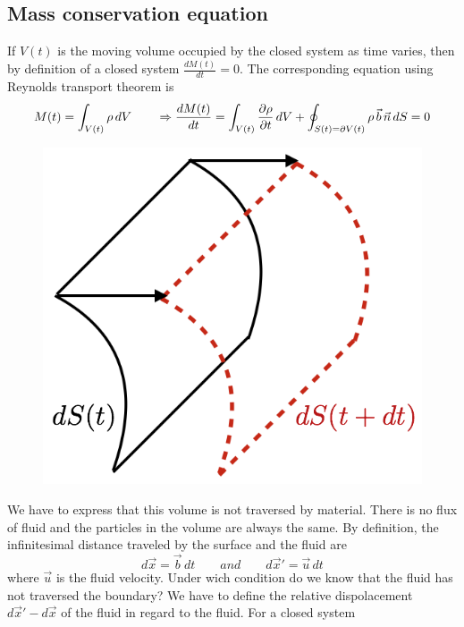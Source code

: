 	\subsection{Mass conservation equation}
	If $V(t)$ is the moving volume occupied by the closed system as time varies, then by definition of a closed system $\frac{dM(t)}{dt} = 0$. The corresponding equation using Reynolds transport theorem is 
	\begin{equation}
		M(t) = \int _{V(t)} \rho\, dV \qquad \Rightarrow \frac{dM(t)}{dt} = \int _{V(t)} \frac{\D \rho}{\D t}\, dV + \oint _{S(t) = \D V(t)} \rho\, \vec{b}\, \vec{n}\, dS = 0
	\end{equation}
	\begin{figure}
	\vspace{-5mm}
	\includegraphics[scale=0.3]{ch1/2}
	\label{fig:1.2}
	\end{figure}
	We have to express that this volume is not traversed by material. There is no flux of fluid and the particles in the volume are always the same. By definition, the infinitesimal distance traveled by the surface and the fluid are
	\begin{equation}
		d\vec{x} = \vec{b}\, dt \qquad and \qquad d\vec{x}' = \vec{u}\, dt
	\end{equation}	 
	where $\vec{u}$ is the fluid velocity. Under wich condition do we know that the fluid has not traversed the boundary? We have to define the relative dispolacement $d\vec{x}'-d\vec{x}$ of the fluid in regard to the fluid. For a closed system 
